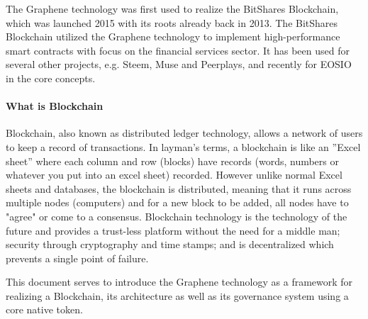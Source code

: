 The Graphene technology was first used to realize the BitShares Blockchain, which was launched 2015 with its
roots already back in 2013. The BitShares Blockchain utilized the Graphene technology to implement 
high-performance smart contracts with focus on the financial services sector. It has been used for several 
other projects, e.g. Steem, Muse and Peerplays, and recently for EOSIO in the core concepts.

\paragraph{What is Blockchain}
Blockchain, also known as distributed ledger technology, allows a network
of users to keep a record of transactions. In layman's terms, a
blockchain is like an ''Excel sheet'' where each column and row (blocks)
have records (words, numbers or whatever you put into an excel sheet)
recorded. However unlike normal Excel sheets and databases, the blockchain is
distributed,  meaning that it runs across multiple nodes (computers) and
for a new block to be added, all nodes have to "agree" or come to a
consensus. Blockchain technology is the technology of the future and provides a
trust-less platform without the need for a middle man; security through
cryptography and time stamps; and is decentralized which prevents a
single point of failure.

This document serves to introduce the Graphene technology as a framework for realizing a Blockchain, its architecture as well as its governance system using a core native token.
